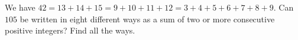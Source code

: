 We have $42=13+14+15=9+10+11+12=3+4+5+6+7+8+9$. Can $105$ be written in eight different ways as a sum of two or more consecutive positive integers? Find all the ways.
